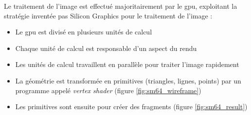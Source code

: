     Le traitement de l'image est effectué majoritairement par le \gls{gpu},
    exploitant la stratégie inventée pas Silicon Graphics\cite{silicon_graphics}
    pour le traitement de l'image :\\
    \begin{itemize}
        \item Le \Gls{gpu} est divisé en plusieurs unités de calcul
        \item Chaque unité de calcul est responsable d'un aspect du rendu
        \item Les unités de calcul travaillent en parallèle pour traiter
        l'image rapidement
        \item La géométrie est transformée en primitives (triangles, lignes, points) par un programme appelé \emph{\gls{vertex shader}} (figure \ref{fig:sm64_wireframe})
        \item Les primitives sont ensuite  pour créer des \glspl{fragment} (figure \ref{fig:sm64_result})\\
    \end{itemize}

